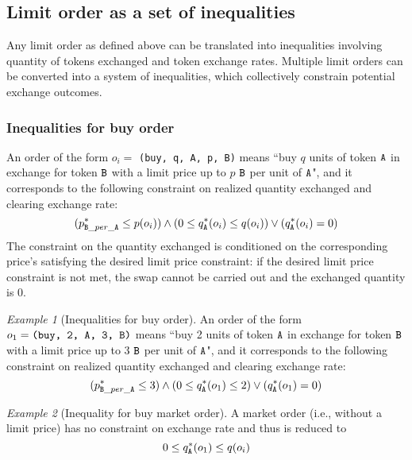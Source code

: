 \documentclass[11pt, reqno]{amsart}
\theoremstyle{definition}
\theoremstyle{remark}
\newtheorem{exmp}{Example}[subsection]
\newcommand{\tA}{\textnormal{\texttt{A}}}
\newcommand{\tB}{\textnormal{\texttt{B}}}
\newcommand{\buy}{\textnormal{\texttt{buy}}}
\begin{document}
\subsection{Limit order as a set of inequalities}
Any limit order as defined above can be translated into inequalities involving
quantity of tokens exchanged and token exchange rates. Multiple limit orders
can be converted into a system of inequalities, which collectively constrain
potential exchange outcomes.

\subsubsection{Inequalities for buy order}
An order of the form $o_i =$ \texttt{(\buy, q, \tA, p, \tB)} means
``buy $q$ units of token $\tA$ in exchange for token $\tB$ with a limit price
up to $p$ $\tB$ per unit of $\tA$",
and it corresponds to the following constraint on realized quantity exchanged
and clearing exchange rate:
\begin{equation*}
	(p_{\tB\_per\_\tA}^* \leq p(o_i)) \land
	(0 \le q_\tA^*(o_i) \leq q(o_i)) \lor
	(q_\tA^*(o_i) = 0)
\end{equation*}
The constraint on the quantity exchanged is conditioned on the corresponding
price's satisfying the desired limit price constraint: if the desired limit price
constraint is not met, the swap cannot be carried out and the exchanged quantity
is 0.

\begin{exmp}[Inequalities for buy order]
An order of the form $o_1 = \texttt{(\buy, 2, \tA, 3, \tB)}$ means
``buy 2 units of token $\tA$ in exchange for token $\tB$ with a limit price up
to 3 $\tB$ per unit of $\tA$",
and it corresponds to the following constraint on realized quantity exchanged
and clearing exchange rate:
\begin{equation*}
    (p_{\tB\_per\_\tA}^* \leq 3) \land
    (0 \le q_\tA^*(o_1) \leq 2) \lor
    (q_\tA^*(o_1) = 0)
\end{equation*}
\end{exmp}

\begin{exmp}[Inequality for buy market order]
A market order (i.e., without a limit price) has no constraint on exchange rate
and thus is reduced to
\[
    0 \le q_\tA^*(o_1) \le q(o_i)
\]
\end{exmp}
\end{document}
